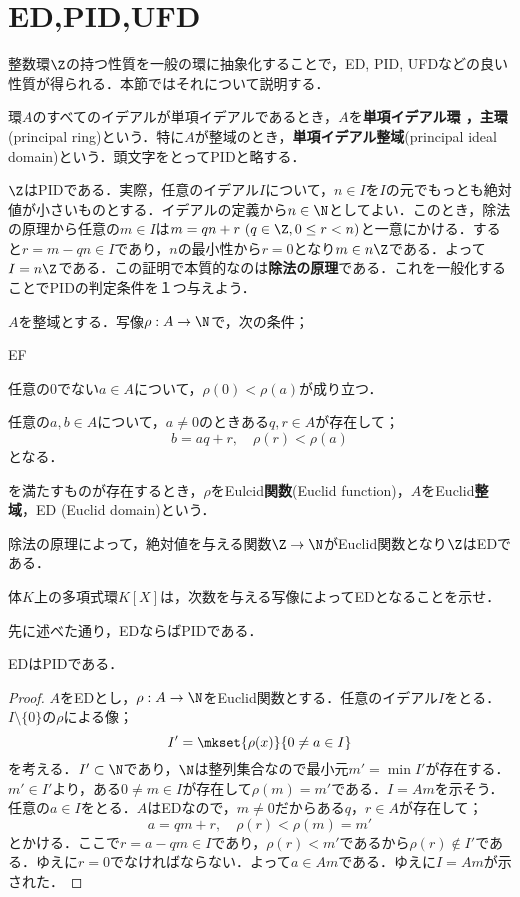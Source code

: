 \section{ED,PID,UFD}
整数環$\Z$の持つ性質を一般の環に抽象化することで，ED, PID, UFDなどの良い性質が得られる．本節ではそれについて説明する．

\begin{defi}[PID]
	環$A$のすべてのイデアルが単項イデアルであるとき，$A$を\textbf{単項イデアル環
		，主環\footnotemark}(principal ring)という．特に$A$が整域のとき，\textbf{単項イデアル整域}(principal ideal domain)という．頭文字をとってPIDと略する．
\end{defi}

$\Z$はPIDである．実際，任意のイデアル$I$について，$n\in I$を$I$の元でもっとも絶対値が小さいものとする．イデアルの定義から$n\in\N$としてよい．このとき，除法の原理から任意の$m\in I$は$m=qn+r~(q\in\Z,0\leq r<n)$と一意にかける．すると$r=m-qn\in I$であり，$n$の最小性から$r=0$となり$m\in n\Z$である．よって$I=n\Z$である．この証明で本質的なのは\textbf{除法の原理}である．これを一般化することでPIDの判定条件を１つ与えよう．

\begin{defi}[Euclid整域]
	$A$を整域とする．写像$\rho:A\to\N$で，次の条件；
	\begin{defiterm}{EF}
		\item 任意の$0$でない$a\in A$について，$\rho(0)<\rho(a)$が成り立つ．
		\item 任意の$a,b\in A$について，$a\neq0$のときある$q,r\in A$が存在して；
		\[b=aq+r,\quad \rho(r)<\rho(a)\]
		となる．
	\end{defiterm}
	を満たすものが存在するとき，$\rho$をEulcid\textbf{関数}(Euclid function)，$A$をEuclid\textbf{整域}，ED (Euclid domain)という．
\end{defi}

除法の原理によって，絶対値を与える関数$\Z\to\N$がEuclid関数となり$\Z$はEDである．
\begin{exer}
	体$K$上の多項式環$K[X]$は，次数を与える写像によってEDとなることを示せ．	
\end{exer}

先に述べた通り，EDならばPIDである．
\begin{thm}
	EDはPIDである．
\end{thm}
\begin{proof}
	$A$をEDとし，$\rho:A\to\N$をEuclid関数とする．任意のイデアル$I$をとる．$I\setminus\{0\}$の$\rho$による像；
	\[I'=\mkset{\rho(x)}{0\neq a\in I}\]
	を考える．$I'\subset\N$であり，$\N$は整列集合なので最小元$m'=\min I'$が存在する．$m'\in I'$より，ある$0\neq m\in I$が存在して$\rho(m)=m'$である．$I=Am$を示そう．任意の$a\in I$をとる．$A$はEDなので，$m\neq0$だからある$q，r\in A$が存在して；
	\[a=qm+r,\quad \rho(r)<\rho(m)=m'\]
	とかける．ここで$r=a-qm\in I$であり，$\rho(r)<m'$であるから$\rho(r)\not\in I'$である．ゆえに$r=0$でなければならない．よって$a\in Am$である．ゆえに$I=Am$が示された．
\end{proof}

